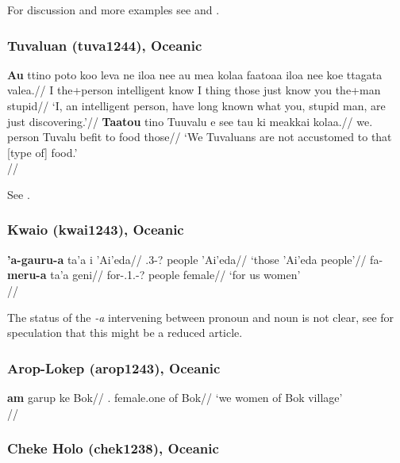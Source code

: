 \documentclass[A4paper]{article}
\begin{document}
For discussion and more examples see \citealp[368, 373]{bauer1993} and \citealp[262f.]{bauer1997}.

\subsubsection{Tuvaluan (tuva1244), Oceanic}

\pex \a
\begingl
\gla \textbf{Au} ttino poto koo leva ne iloa nee au mea kolaa faatoaa iloa nee koe ttagata valea.//
\glb I the+person intelligent \Pfv{} {} {} know \Erg{} I thing those just know \Erg{} you the+man stupid//
\glft `I, an intelligent person, have long known what you, stupid man, are just discovering.'//
\endgl
\a\begingl
\gla \textbf{Taatou} tino Tuuvalu e see tau ki meakkai kolaa.//
\glb we.\Incl{} person Tuvalu \Npst{} \Neg{} befit to food those//
\glft `We Tuvaluans are not accustomed to that [type of] food.'\\\citep[393, (2018/2019)]{besnier2000}//
\endgl
\xe

See \citealp[392f.]{besnier2000}.

\subsubsection{Kwaio (kwai1243), Oceanic}

\pex
\a \begingl
\gla \textbf{'a-gauru-a} ta'a i 'Ai'eda//
\glb  \Fpron.3\Tri-? people \Loc{} 'Ai'eda//
\glft `those 'Ai'eda people'//
\endgl
\a
\begingl
\gla fa-\textbf{meru-a} ta'a geni//
\glb for-\Spron.1\Tri.\Excl-? people female//
\glft `for us women' \\\citep[after][104]{keesing1985}//
\endgl
\xe

The status of the \emph{-a} intervening between pronoun and noun is not clear, see \citet[25]{hoehn2020ThirdGap} for speculation that this might be a reduced article.

\subsubsection{Arop-Lokep (arop1243), Oceanic}

\ex
\begingl
\gla \textbf{am} garup ke Bok//
\Excl.\Pl{} female.one of Bok//
\glft `we women of Bok village'\\\citep[255]{djernes2002}//
\endgl
\xe


\subsubsection{Cheke Holo (chek1238), Oceanic}
\end{document}
